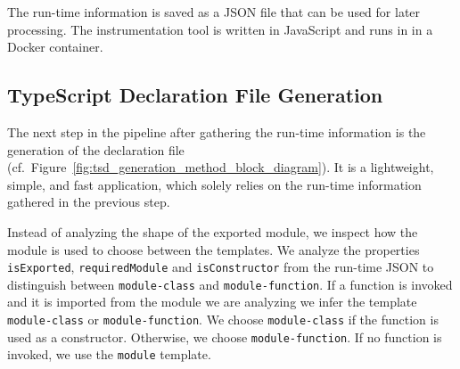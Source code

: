 \documentclass[english,cleveref,autoref,submission]{programming}
\newcommand{\figref}[1]{Figure~\ref{#1}}
\begin{document}
The run-time information is saved as a JSON file that can be used for later
processing. The instrumentation tool is written in JavaScript and runs in \NodeJS{} in a
Docker container.   

\subsection{TypeScript Declaration File Generation}
\label{sec:typescr-decl-file}

The next step in the pipeline after gathering the run-time information is
the generation of the declaration file (cf.\
\figref{fig:tsd_generation_method_block_diagram}). It is a lightweight,
simple, and fast application, which solely relies on the run-time
information gathered in the previous step.

Instead of analyzing the shape of the exported module, we inspect how the module is used
to choose between the templates. We analyze the properties \texttt{isExported},
\texttt{requiredModule} and \texttt{isConstructor} from the run-time JSON to distinguish
between \texttt{module-class} and \texttt{module-function}. If a function is invoked and
it is imported from the module we are analyzing we infer the template
\texttt{module-class} or \texttt{module-function}. We choose \texttt{module-class} if the
function is used as a constructor. Otherwise, we choose
\texttt{module-function}.
If no function is invoked, we use the \texttt{module}
template.


\end{document}
